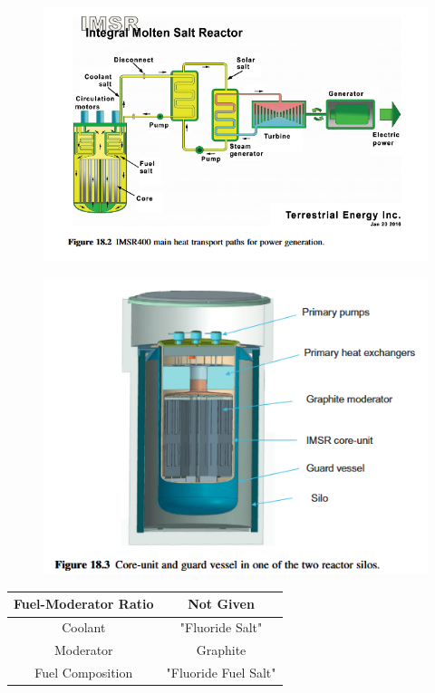 \documentclass[letterpaper]{article}
\begin{document}
\begin{figure}[H]
  \centering
  \includegraphics[width=1.0\linewidth]{figures/IMSRsource1.png}
  \label{fig:fig8}
\end{figure}

\begin{figure}[H]
  \centering
  \includegraphics[width=1.0\linewidth]{figures/IMSRsource2.png}
  \label{fig:fig9}
\end{figure}

\begin{center}
\begin{tabular}{|c|c|}
\hline
Fuel-Moderator Ratio & Not Given \\
\hline
Coolant & "Fluoride Salt" \\
\hline
Moderator & Graphite \\
\hline
Fuel Composition & "Fluoride Fuel Salt" \\
\hline
\end{tabular}
\end{center}
\end{document}
